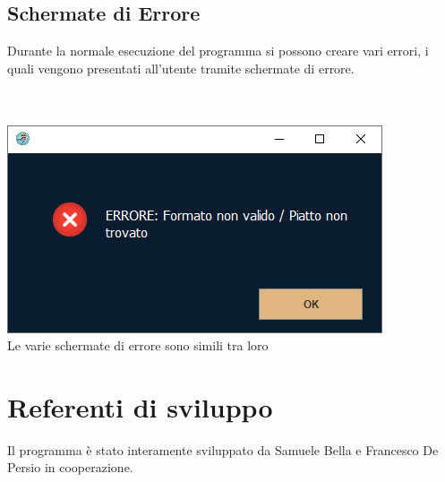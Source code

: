 \documentclass{article}
\begin{document}
    \subsection{Schermate di Errore}
    Durante la normale esecuzione del programma si possono creare vari errori, i quali vengono presentati all'utente tramite schermate di errore.
    \\\\\\
    \begin{center}
        \includegraphics[scale=0.7]{Errore.png}\\
        \caption{Le varie schermate di errore sono simili tra loro}
    \end{center}
    
    \newpage
    
    \section{Referenti di sviluppo}
    Il programma è stato interamente sviluppato da Samuele Bella e Francesco De Persio in cooperazione.
    
\end{document}
